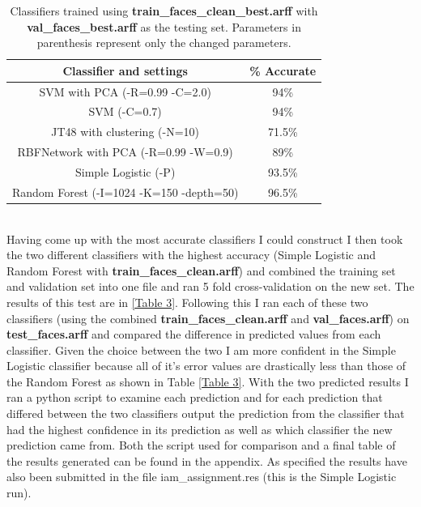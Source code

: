 \documentclass{report}
\begin{document}
\begin{table}[h]
\begin{minipage}[b]{0.5\linewidth}
\begin{tabular}{|c|c|}
      \hline
          {\bf Classifier and settings} & {\bf \% Accurate}\\
          \hline
          SVM with PCA (-R=0.99 -C=2.0) & 94\%\\
          \hline
          SVM (-C=0.7) & 94\%\\
          \hline
          JT48 with clustering (-N=10) & 71.5\%\\
          \hline
          RBFNetwork with PCA (-R=0.99 -W=0.9) & 89\%\\
          \hline
          Simple Logistic (-P) & 93.5\%\\
          \hline
          Random Forest (-I=1024 -K=150 -depth=50) & 96.5\%\\
          \hline
    \end{tabular}
    \caption{Classifiers trained using {\bf
        train\_faces\_clean\_best.arff} with {\bf
        val\_faces\_best.arff} as the testing set. Parameters in
      parenthesis represent only the changed parameters.}
    \label{fig}
  \end{minipage}
\end{table}\\
Having come up with the most accurate classifiers I could construct I
then took the two different classifiers with the highest accuracy
(Simple Logistic and Random Forest with {\bf
  train\_faces\_clean.arff}) and combined the training set and
validation set into one file and ran 5 fold cross-validation on the
new set. The results of this test are in \ref{Table 3}. Following this
I ran each of these two classifiers (using the combined {\bf
  train\_faces\_clean.arff} and {\bf val\_faces.arff}) on
{\bf test\_faces.arff} and
compared the difference in predicted values from each
classifier. Given the choice between the two I am more confident in
the Simple Logistic classifier because all of it's error values are
drastically less than those of the Random Forest as shown in Table
\ref{Table 3}. With the two predicted results I ran a python script to
examine each prediction and for each prediction that differed between
the two classifiers output the prediction from the classifier that had
the highest confidence in its prediction as well as which classifier
the new prediction came from. Both the script used for comparison and
a final table of the results generated can be found in the
appendix. As specified the results have also been submitted in the
file iam\_assignment.res (this is the Simple Logistic run).
\end{document}
